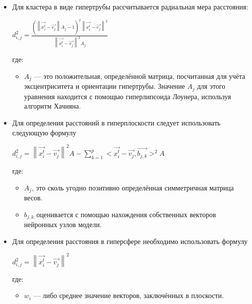 \documentclass[unicode, 12pt, a4paper,oneside,fleqn]{article}
\begin{document}
\begin{itemize}
\item Для кластера в виде гипертрубы рассчитывается радиальная мера
  расстояния:

  $d^2_{i,j} = \frac
  {(\left\|\vec{x^t_i}-\vec{v_j}\right\|A_j - 1)^2 \left\|\vec{x^t_i}-\vec{v_j}\right\|^2}
  {\left\|\vec{x^t_i}-\vec{v_j}\right\|^2A_j}$
  
  где: \begin{itemize}
  \item $A_j$ — это положительная, определённой матрица, посчитанная
    для учёта эксцентриситета и ориентации гипертрубы. Значение $A_j$ для
    этого уравнения находится с помощью гиперлипсоида Лоунера, используя
    алгоритм Хачияна.
  \end{itemize}

\item Для определения расстояний в гиперплоскости следует использовать
  следующую формулу

  $d^2_{i,j} = 
  \left\|\vec{x^t_i}-\vec{v_j}\right\|^2A -
  \sum_{k=1}^{p} {<\vec{x^t_i}-\vec{v_j}, \vec{b_{j,k}}>^2A}$

  
  где: \begin{itemize}
  \item $A_j$, это сколь угодно позитивно определённая симметричная
    матрица весов. 
  \item $b_{j, k}$ оценивается с помощью нахождения собственных
    векторов нейронных узлов модели.
    \end{itemize}

  \item Для определения расстояния в гиперсфере необходимо
    использовать формулу
    
    $d^2_{i,j} = \left\|\vec{x^t_i}-\vec{v_j}\right\|^2$
    
    где: \begin{itemize}
    \item $w_i$ — либо среднее значение векторов, заключённых в
      плоскости. 
    \end{itemize}
\end{itemize}

\newpage


\end{document}

